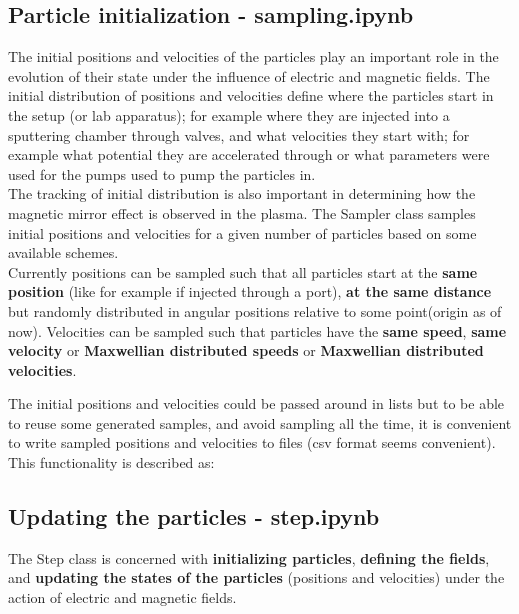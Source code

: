 \documentclass[12pt]{article}
\begin{document}
	
	
	
	
	\subsection{Particle initialization - sampling.ipynb}
	The initial positions and velocities of the particles play an important role in the evolution of their state under the influence of electric and magnetic fields. The initial distribution of positions and velocities define where the particles start in the setup (or lab apparatus); for example where they are injected into a sputtering chamber through valves, and what velocities they start with; for example what potential they are accelerated through or what parameters were used for the pumps used to pump the particles in.\\
	
	\noindent The tracking of initial distribution is also important in determining how the magnetic mirror effect is observed in the plasma. The Sampler class samples initial positions and velocities for a given number of particles based on some available schemes. \\
	
	\noindent Currently positions can be sampled such that all particles start at the \textbf{same position} (like for example if injected through a port), \textbf{at the same distance} but randomly distributed in angular positions relative to some point(origin as of now). Velocities can be sampled such that particles have the \textbf{same speed}, \textbf{same velocity} or \textbf{Maxwellian distributed speeds} or \textbf{Maxwellian distributed velocities}.   
	
	
	
	\noindent The initial positions and velocities could be passed around in lists but to be able to reuse some generated samples, and avoid sampling all the time, it is convenient to write sampled positions and velocities to files (csv format seems convenient). This functionality is described as:
	
	
	\subsection{Updating the particles - step.ipynb}
	The Step class is concerned with \textbf{initializing particles}, \textbf{defining the fields}, and \textbf{updating the states of the particles} (positions and velocities) under the action of electric and magnetic fields.
	
	
\end{document}
